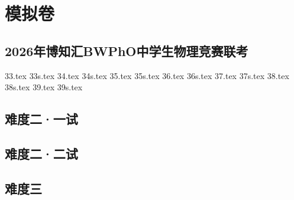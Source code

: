 \chapter{模拟卷}
\section{2026年博知汇BWPhO中学生物理竞赛联考}
{33.tex}
{33s.tex}
{34.tex}
{34s.tex}
{35.tex}
{35s.tex}
{36.tex}
{36s.tex}
{37.tex}
{37s.tex}
{38.tex}
{38s.tex}
{39.tex}
{39s.tex}
\section{难度二·一试}
\section{难度二·二试}
\section{难度三}